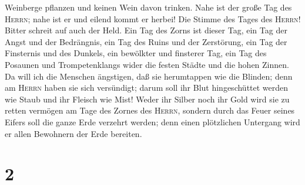 Weinberge pflanzen und keinen Wein davon trinken.  Nahe
ist der große Tag des \textsc{Herrn}; nahe ist er und eilend kommt er
herbei! Die Stimme des Tages des \textsc{Herrn}! Bitter schreit auf auch
der Held.  Ein Tag des Zorns ist dieser Tag, ein Tag der
Angst und der Bedrängnis, ein Tag des Ruins und der Zerstörung, ein Tag
der Finsternis und des Dunkels, ein bewölkter und finsterer Tag,
 ein Tag des Posaunen und Trompetenklangs wider die
festen Städte und die hohen Zinnen.  Da will ich die
Menschen ängstigen, daß sie herumtappen wie die Blinden; denn am
\textsc{Herrn} haben sie sich versündigt; darum soll ihr Blut
hingeschüttet werden wie Staub und ihr Fleisch wie Mist! 
Weder ihr Silber noch ihr Gold wird sie zu retten vermögen am Tage des
Zornes des \textsc{Herrn}, sondern durch das Feuer seines Eifers soll
die ganze Erde verzehrt werden; denn einen plötzlichen Untergang wird er
allen Bewohnern der Erde bereiten.

\hypertarget{section-1}{%
\section{2}\label{section-1}}

